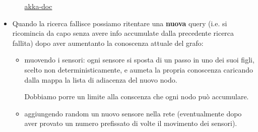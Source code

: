 \documentclass{article}
\begin{document}
\begin{itemize}
\begin{itemize}

    \href{https://doc.akka.io/docs/akka/2.5/distributed-pub-sub.html}
    {akka-doc}
  \end{itemize}
\item Quando la ricerca fallisce possiamo ritentare una \textbf{nuova} query
  (i.e. si ricomincia da capo senza avere info accumulate dalla precedente
  ricerca fallita) dopo aver aumentanto la conoscenza attuale del grafo:
  \begin{itemize}
  \item muovendo i sensori: ogni sensore si sposta di un passo in uno
    dei suoi figli, scelto non deterministicamente, e aumeta la propria
    conoscenza caricando dalla mappa la lista di adiacenza del nuovo nodo.

    Dobbiamo porre un limite alla conscenza che ogni nodo pu\`o
    accumulare.
  \item aggiungendo random un nuovo sensore nella rete
    (eventualmente dopo aver provato un numero prefissato di volte il
    movimento dei sensori).
  \end{itemize}
\end{itemize}
%
\end{document}
